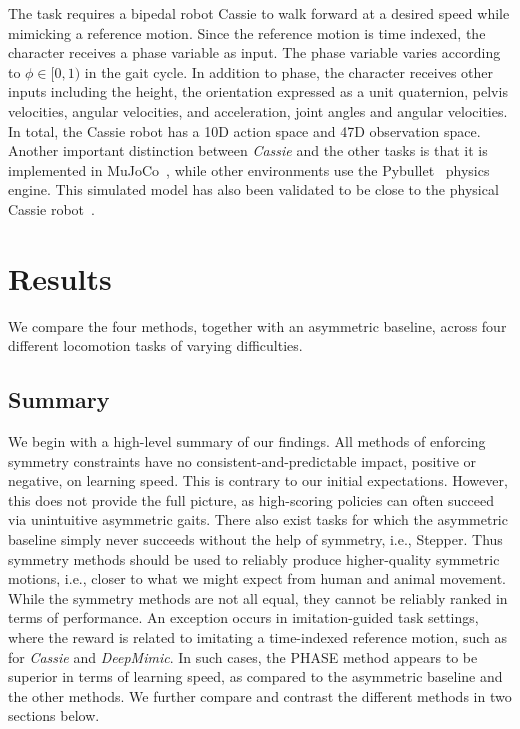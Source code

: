   The task requires a bipedal robot Cassie to walk forward at a desired speed 
while mimicking a reference motion.  Since the reference motion is time indexed, the character receives a phase variable as input.  
The phase variable varies according to $\phi \in [0,1)$ in the gait cycle.  
In addition to phase, the character receives other inputs including the height, the orientation expressed as a unit quaternion,
pelvis velocities, angular velocities, and acceleration, joint angles and angular velocities.  
In total, the Cassie robot has a 10D action space and 47D observation space.  
Another important distinction between {\it Cassie} and the other tasks is that it is implemented in 
MuJoCo~\citep{ref:Mujoco}, while other environments use the Pybullet~\citep{ref:Pybullet} physics engine. 
This simulated model has also been validated to be close to the 
physical Cassie robot~\cite{cassie-sim-to-real}.


\section{Results}

We compare the four methods, together with an asymmetric baseline, across four different 
locomotion tasks of varying difficulties.  

\subsection{Summary}

We begin with a high-level summary of our  findings.
All methods of enforcing symmetry constraints have no consistent-and-predictable impact,
positive or negative, on learning speed. This is contrary to our initial expectations. 
However, this does not provide the full picture, as
high-scoring policies can often succeed via unintuitive asymmetric gaits.
There also exist tasks for which the asymmetric baseline simply never succeeds without the
help of symmetry, i.e., Stepper.
Thus symmetry methods should be used to reliably produce higher-quality symmetric motions, 
i.e., closer to what we might expect from human and animal movement.
While the symmetry methods are not all equal, they cannot be reliably ranked in terms of performance.
An exception occurs in imitation-guided task settings, where the reward is related to imitating a
time-indexed reference motion, such as for \textit{Cassie} and \textit{DeepMimic}.
In such cases, the PHASE method appears to be superior in terms of learning speed,
as compared to the asymmetric baseline and the other methods.
We further compare and contrast the different methods in two sections below.

